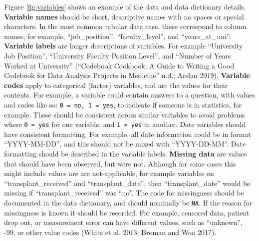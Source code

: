\documentclass[
]{article}
\begin{document}
Figure \ref{fig:variables} shows an example of the data and data dictionary details.
\textbf{Variable names} should be short, descriptive names with no spaces or special characters. In the most common tabular data case, these correspond to column names, for example, ``job\_position'', ``faculty\_level'', and ``years\_at\_uni''. \textbf{Variable labels} are longer descriptions of variables. For example ``University Job Position'', ``University Faculty Position Level'', and ``Number of Years Worked at University'' (``Codebook Cookbook: A Guide to Writing a Good Codebook for Data Analysis Projects in Medicine'' n.d.; Arslan 2019). \textbf{Variable codes} apply to categorical (factor) variables, and are the values for their contents. For example, a variable could contain answers to a question, with values and codes like so: \texttt{0\ =\ no,\ 1\ =\ yes}, to indicate if someone is in statistics, for example. These should be consistent across similar variables to avoid problems where \texttt{0\ =\ yes} for one variable, and \texttt{1\ =\ yes} in another. Date variables should have consistent formatting. For example, all date information could be in format ``YYYY-MM-DD'', and this should not be mixed with ``YYYY-DD-MM''. Date formatting should be described in the variable labels. \textbf{Missing data} are values that should have been observed, but were not. Although for some cases this might include values are are not-applicable, for example variables on ``transplant\_received'' and ``transplant\_date'', then ``transplant\_date'' would be missing if ``transplant\_received'' was ``no''. The code for missingness should be documented in the data dictionary, and should nominally be \texttt{NA}. If the reason for missingness is known it should be recorded. For example, censored data, patient drop out, or measurement error can have different values, such as ``unknown'', -99, or other value codes (White et al. 2013; Broman and Woo 2017).
\end{document}
